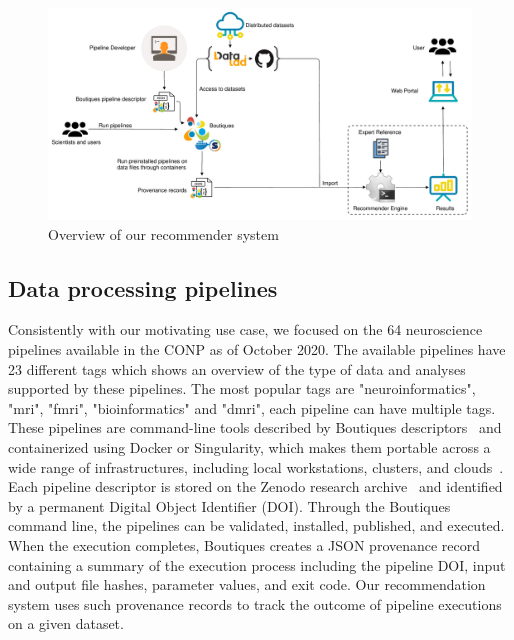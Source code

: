 \documentclass[conference]{IEEEtran}
\begin{document}
\begin{figure}[ht]
  \centering
  \includegraphics[width=\textwidth]{figures/Methodology.pdf}%
  \caption{Overview of our recommender system  }
  \label{fig:method}
  \end{figure}  


\subsection{Data processing pipelines} 
Consistently with our motivating use case, we focused on the 64
neuroscience pipelines available in the CONP as of October
2020. 
The available pipelines have 23 different tags which shows an overview of the type of data
and analyses supported by these pipelines. The most popular tags are "neuroinformatics", "mri", "fmri", "bioinformatics" and "dmri", each pipeline can have multiple tags. These pipelines are command-line
tools described by Boutiques descriptors~\cite{glatard2018boutiques} and
containerized using Docker or Singularity, which makes them portable across
a wide range of infrastructures, including local workstations, clusters,
and clouds~\cite{kiar2019serverless}. Each pipeline descriptor is stored on
the Zenodo research archive~\cite{https://doi.org/10.25495/7gxk-rd71} and identified by a permanent Digital Object
Identifier (DOI). Through the Boutiques command line, the pipelines can be
validated, installed, published, and executed. When the execution
completes, Boutiques creates a JSON provenance record containing a summary
of the execution process including the pipeline DOI, input and output file
hashes, parameter values, and exit code. Our recommendation system uses
such provenance records to track the outcome of pipeline executions on a
given dataset.
\end{document}
